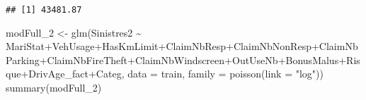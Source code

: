 \documentclass[
]{article}
\newenvironment{Shaded}{\begin{snugshade}}{\end{snugshade}}
\newcommand{\AttributeTok}[1]{\textcolor[rgb]{0.77,0.63,0.00}{#1}}
\newcommand{\FunctionTok}[1]{\textcolor[rgb]{0.00,0.00,0.00}{#1}}
\newcommand{\NormalTok}[1]{#1}
\newcommand{\OtherTok}[1]{\textcolor[rgb]{0.56,0.35,0.01}{#1}}
\newcommand{\SpecialCharTok}[1]{\textcolor[rgb]{0.00,0.00,0.00}{#1}}
\newcommand{\StringTok}[1]{\textcolor[rgb]{0.31,0.60,0.02}{#1}}
\begin{document}
\begin{verbatim}
## [1] 43481.87
\end{verbatim}

\begin{Shaded}
\begin{Highlighting}[]
\NormalTok{modFull\_2 }\OtherTok{\textless{}{-}} \FunctionTok{glm}\NormalTok{(Sinistres2 }\SpecialCharTok{\textasciitilde{}}\NormalTok{ MariStat}\SpecialCharTok{+}\NormalTok{VehUsage}\SpecialCharTok{+}\NormalTok{HasKmLimit}\SpecialCharTok{+}\NormalTok{ClaimNbResp}\SpecialCharTok{+}\NormalTok{ClaimNbNonResp}\SpecialCharTok{+}\NormalTok{ClaimNbParking}\SpecialCharTok{+}\NormalTok{ClaimNbFireTheft}\SpecialCharTok{+}\NormalTok{ClaimNbWindscreen}\SpecialCharTok{+}\NormalTok{OutUseNb}\SpecialCharTok{+}\NormalTok{BonusMalus}\SpecialCharTok{+}\NormalTok{Risque}\SpecialCharTok{+}\NormalTok{DrivAge\_fact}\SpecialCharTok{+}\NormalTok{Categ, }\AttributeTok{data =}\NormalTok{ train, }\AttributeTok{family =} \FunctionTok{poisson}\NormalTok{(}\AttributeTok{link =} \StringTok{"log"}\NormalTok{))}
\FunctionTok{summary}\NormalTok{(modFull\_2)}
\end{Highlighting}
\end{Shaded}
\end{document}
